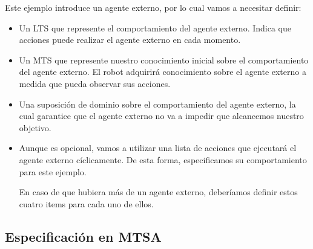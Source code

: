 Este ejemplo introduce un agente externo, por lo cual vamos a necesitar definir:

\begin{itemize}

\item
Un LTS que represente el comportamiento del agente externo. Indica que acciones puede realizar el agente externo en cada momento.

\item
Un MTS que represente nuestro conocimiento inicial sobre el comportamiento del agente externo. 
El robot adquirirá conocimiento sobre el agente externo a medida que pueda observar sus acciones.

\item
Una suposición de dominio sobre el comportamiento del agente externo, la cual garantice que el agente externo no va a impedir 
que alcancemos nuestro objetivo.

\item
Aunque es opcional, vamos a utilizar una lista de acciones que ejecutará el agente externo cíclicamente. 
De esta forma, especificamos su comportamiento para este ejemplo.

En caso de que hubiera más de un agente externo, deberíamos definir estos cuatro items para cada uno de ellos.

\end{itemize}

\clearpage

\subsection{Especificación en MTSA}

